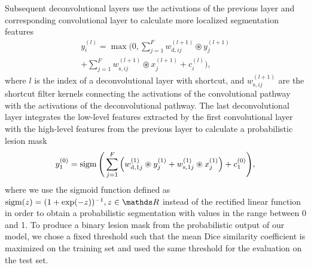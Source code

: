 Subsequent
deconvolutional layers use the activations of the previous layer
and corresponding convolutional layer to calculate more localized segmentation
features
\begin{multline}
y^{(l)}_i = \max\Bigg(0, 
\sum_{j=1}^Fw^{(l+1)}_{\text{d},ij}\circledast y^{(l+1)}_j\\
+ \sum_{j=1}^F w^{(l+1)}_{\text{s},ij}\circledast x^{(l+1)}_j +
c^{(l)}_i\Bigg),
\end{multline}
where $l$ is the index of a deconvolutional layer with shortcut, and
$w^{(l+1)}_{\text{s},ij}$ are the shortcut filter kernels connecting the
activations of the convolutional pathway with the activations of the
deconvolutional pathway. The last deconvolutional layer integrates the low-level
features extracted by the first convolutional layer with the high-level features
from the previous layer to calculate a probabilistic lesion mask
\begin{equation}
y^{(0)}_1 = \operatorname{sigm}\Bigg(\sum_{j=1}^F\Big(w^{(1)}_{\text{d},1j}\circledast
y^{(1)}_j +
w^{(1)}_{\text{s},1j}\circledast x^{(1)}_j\Big) + c^{(0)}_1\Bigg),
\end{equation}
where we use the sigmoid function defined as $\sigm(z) = (1 + \exp(-z))^{-1}, z
\in \R$ instead of the rectified linear function in order to obtain a
probabilistic segmentation with values in the range between 0 and 1.
To produce a binary lesion mask from the probabilistic output of our model, we
chose a fixed threshold such that the mean Dice similarity coefficient
\cite{dice1945measures} is maximized on the training set and used the same
threshold for the evaluation on the test set.

